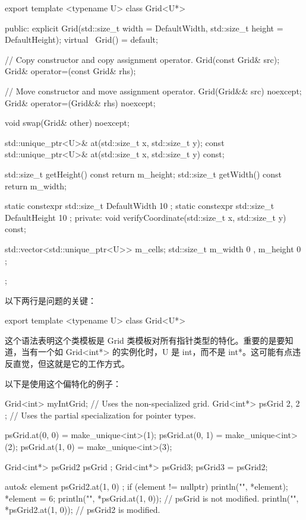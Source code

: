 \begin{cpp}
export template <typename U>
class Grid<U*>
{
    public:
        explicit Grid(std::size_t width = DefaultWidth,
            std::size_t height = DefaultHeight);
        virtual ~Grid() = default;

        // Copy constructor and copy assignment operator.
        Grid(const Grid& src);
        Grid& operator=(const Grid& rhs);

        // Move constructor and move assignment operator.
        Grid(Grid&& src) noexcept;
        Grid& operator=(Grid&& rhs) noexcept;

        void swap(Grid& other) noexcept;

        std::unique_ptr<U>& at(std::size_t x, std::size_t y);
        const std::unique_ptr<U>& at(std::size_t x, std::size_t y) const;

        std::size_t getHeight() const { return m_height; }
        std::size_t getWidth() const { return m_width; }

        static constexpr std::size_t DefaultWidth { 10 };
        static constexpr std::size_t DefaultHeight { 10 };
    private:
        void verifyCoordinate(std::size_t x, std::size_t y) const;

        std::vector<std::unique_ptr<U>> m_cells;
        std::size_t m_width { 0 }, m_height { 0 };
};
\end{cpp}

以下两行是问题的关键：

\begin{cpp}
export template <typename U>
class Grid<U*>
\end{cpp}

这个语法表明这个类模板是 Grid 类模板对所有指针类型的特化。重要的是要知道，当有一个如 Grid<int*> 的实例化时，U 是 int，而不是 int*。这可能有点违反直觉，但这就是它的工作方式。

以下是使用这个偏特化的例子：

\begin{cpp}
Grid<int> myIntGrid; // Uses the non-specialized grid.
Grid<int*> psGrid { 2, 2 }; // Uses the partial specialization for pointer types.

psGrid.at(0, 0) = make_unique<int>(1);
psGrid.at(0, 1) = make_unique<int>(2);
psGrid.at(1, 0) = make_unique<int>(3);

Grid<int*> psGrid2 { psGrid };
Grid<int*> psGrid3;
psGrid3 = psGrid2;

auto& element { psGrid2.at(1, 0) };
if (element != nullptr) {
    println("{}", *element);
    *element = 6;
}
println("{}", *psGrid.at(1, 0)); // psGrid is not modified.
println("{}", *psGrid2.at(1, 0)); // psGrid2 is modified.
\end{cpp}

